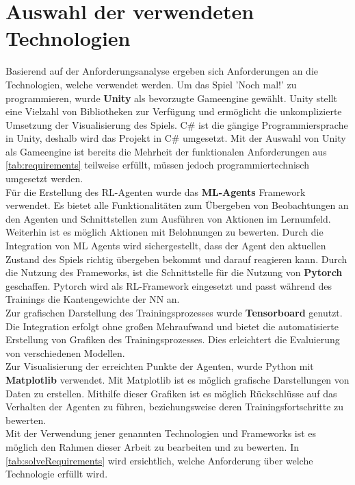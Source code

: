 \section{Auswahl der verwendeten Technologien}
Basierend auf der Anforderungsanalyse ergeben sich Anforderungen an die Technologien, welche verwendet werden. 
Um das Spiel 'Noch mal!' zu programmieren, wurde \textbf{Unity} als bevorzugte Gameengine gewählt. Unity stellt eine Vielzahl von Bibliotheken zur Verfügung und ermöglicht die unkomplizierte Umsetzung der Visualisierung des Spiels. C\# ist die gängige Programmiersprache in Unity, deshalb wird das Projekt in C\# umgesetzt. Mit der Auswahl von Unity als Gameengine ist bereits die Mehrheit der funktionalen Anforderungen aus \ref{tab:requirements} teilweise erfüllt, müssen jedoch programmiertechnisch umgesetzt werden. \\
Für die Erstellung des RL-Agenten wurde das \textbf{ML-Agents} Framework verwendet. Es bietet alle Funktionalitäten zum Übergeben von Beobachtungen an den Agenten und Schnittstellen zum Ausführen von Aktionen im Lernumfeld. Weiterhin ist es möglich Aktionen mit Belohnungen zu bewerten. Durch die Integration von ML Agents wird sichergestellt, dass der Agent den aktuellen Zustand des Spiels richtig übergeben bekommt und darauf reagieren kann. Durch die Nutzung des Frameworks, ist die Schnittstelle für die Nutzung von \textbf{Pytorch} geschaffen. Pytorch wird als RL-Framework eingesetzt und passt während des Trainings die Kantengewichte der NN an.\\
Zur grafischen Darstellung des Trainingsprozesses wurde \textbf{Tensorboard} genutzt. Die Integration erfolgt ohne großen Mehraufwand und bietet die automatisierte Erstellung von Grafiken des Trainingsprozesses. Dies erleichtert die Evaluierung von verschiedenen Modellen. \\ 
Zur Visualisierung der erreichten Punkte der Agenten, wurde Python mit \textbf{Matplotlib} verwendet. Mit Matplotlib ist es möglich grafische Darstellungen von Daten zu erstellen. Mithilfe dieser Grafiken ist es möglich Rückschlüsse auf das Verhalten der Agenten zu führen, beziehungsweise deren Trainingsfortschritte zu bewerten. \\
Mit der Verwendung jener genannten Technologien und Frameworks ist es möglich den Rahmen dieser Arbeit zu bearbeiten und zu bewerten.
In \ref{tab:solveRequirements} wird ersichtlich, welche Anforderung über welche Technologie erfüllt wird. \\


